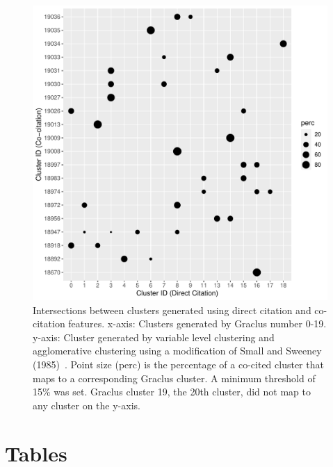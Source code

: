 \begin{figure}[ht]
\centering
  \includegraphics[scale=0.6]{graclus_cocit_fig.pdf}
\caption{Intersections between clusters generated using direct citation and co-citation features. x-axis: Clusters generated by Graclus number 0-19. y-axis: Cluster generated by variable level clustering and agglomerative clustering using a modification of Small and Sweeney (1985)~\cite{small_clustering_1985}. Point size (perc) is the percentage of a co-cited cluster that maps to a corresponding Graclus cluster. A minimum threshold of 15\% was set. Graclus cluster 19, the 20th cluster, did not map to any cluster on the y-axis.}
\label{fig:graclus_cocit_fig}       %
\end{figure}
\newpage
\clearpage
\section{Tables}

